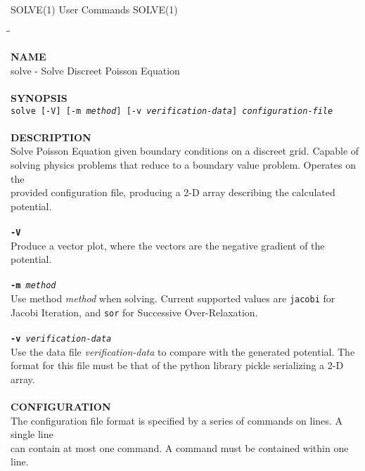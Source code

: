 \begin{flushleft}
	SOLVE(1)
	\hfill User Commands \hfill
	SOLVE(1)
\end{flushleft}

\begin{tabbing}
\hspace{30pt}\=\hspace{30pt}\=\kill

\textbf{NAME}\\
\> solve - Solve Discreet Poisson Equation\\
\\
\textbf{SYNOPSIS}\\
	\> \texttt{solve [-V] [-m \textit{method}] [-v \textit{verification-data}] \textit{configuration-file}}\\
	\\
\textbf{DESCRIPTION}\\
\> Solve Poisson Equation given boundary conditions on a discreet grid. Capable of\\
\> solving physics problems that reduce to a boundary value problem. Operates on the\\
\> provided configuration file, producing a 2-D array describing the calculated potential.\\
\\
\> \texttt{\textbf{-V}} \\
\> \> Produce a vector plot, where the vectors are the negative gradient of the potential.\\
\\
	\> \texttt{\textbf{-m} \textit{method}} \\
	\> \> Use method \textit{method} when solving. Current supported values are \texttt{jacobi} for\\
	\> \> Jacobi Iteration, and \texttt{sor} for Successive Over-Relaxation.\\
\\
	\> \texttt{\textbf{-v} \textit{verification-data}} \\
	\> \> Use the data file \textit{verification-data} to compare with the generated potential. The \\
	\> \> format for this file must be that of the python library pickle serializing a 2-D array.\\
\\
\textbf{CONFIGURATION}\\
\> The configuration file format is specified by a series of commands on lines. A single line\\
\> can contain at most one command. A command must be contained within one line.\\

\end{tabbing}
